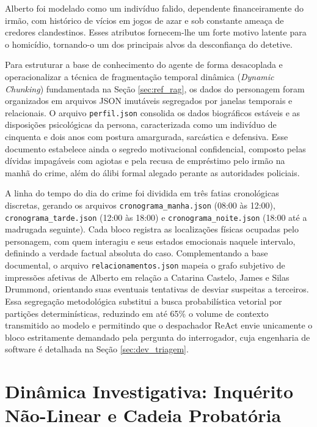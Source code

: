 Alberto foi modelado como um indivíduo falido, dependente financeiramente do irmão, com histórico de vícios em jogos de azar e sob constante ameaça de credores clandestinos. Esses atributos fornecem-lhe um forte motivo latente para o homicídio, tornando-o um dos principais alvos da desconfiança do detetive. 

\label{sec:met_arquitetura_rag}
Para estruturar a base de conhecimento do agente de forma desacoplada e operacionalizar a técnica de fragmentação temporal dinâmica (\textit{Dynamic Chunking}) fundamentada na Seção \ref{sec:ref_rag}, os dados do personagem foram organizados em arquivos JSON imutáveis segregados por janelas temporais e relacionais. O arquivo \texttt{perfil.json} consolida os dados biográficos estáveis e as disposições psicológicas da persona, caracterizada como um indivíduo de cinquenta e dois anos com postura amargurada, sarcástica e defensiva. Esse documento estabelece ainda o segredo motivacional confidencial, composto pelas dívidas impagáveis com agiotas e pela recusa de empréstimo pelo irmão na manhã do crime, além do álibi formal alegado perante as autoridades policiais.

A linha do tempo do dia do crime foi dividida em três fatias cronológicas discretas, gerando os arquivos \texttt{cronograma\_manha.json} (08:00 às 12:00), \texttt{cronograma\_tarde.json} (12:00 às 18:00) e \texttt{cronograma\_noite.json} (18:00 até a madrugada seguinte). Cada bloco registra as localizações físicas ocupadas pelo personagem, com quem interagiu e seus estados emocionais naquele intervalo, definindo a verdade factual absoluta do caso. Complementando a base documental, o arquivo \texttt{relacionamentos.json} mapeia o grafo subjetivo de impressões afetivas de Alberto em relação a Catarina Castelo, James e Silas Drummond, orientando suas eventuais tentativas de desviar suspeitas a terceiros. Essa segregação metodológica substitui a busca probabilística vetorial por partições determinísticas, reduzindo em até 65\% o volume de contexto transmitido ao modelo e permitindo que o despachador ReAct envie unicamente o bloco estritamente demandado pela pergunta do interrogador, cuja engenharia de software é detalhada na Seção \ref{sec:dev_triagem}.

\section{Dinâmica Investigativa: Inquérito Não-Linear e Cadeia Probatória}
\label{sec:met_dinamica_investigativa}
\label{sec:met_detalhamento_fase1}

